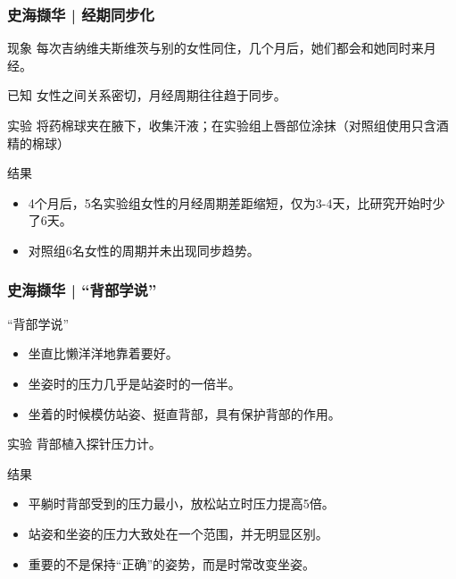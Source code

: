 \begin{frame}
  \frametitle{史海撷华 | 经期同步化}
  \begin{block}{现象}
    每次吉纳维夫\textbullet 斯维茨与别的女性同住，几个月后，她们都会和她同时来月经。
  \end{block}
  \pause
  \begin{block}{已知}
    女性之间关系密切，月经周期往往趋于同步。
  \end{block}
  \pause
  \begin{block}{实验}
    将药棉球夹在腋下，收集汗液；在实验组上唇部位涂抹（对照组使用只含酒精的棉球）
  \end{block}
  \pause
  \begin{block}{结果}
    \begin{itemize}
      \item 4个月后，5名实验组女性的月经周期差距缩短，仅为3-4天，比研究开始时少了6天。
      \item 对照组6名女性的周期并未出现同步趋势。
    \end{itemize}
  \end{block}
\end{frame}

\begin{frame}
  \frametitle{史海撷华 | “背部学说”}
  \begin{block}{“背部学说”}
    \begin{itemize}
      \item 坐直比懒洋洋地靠着要好。
      \item 坐姿时的压力几乎是站姿时的一倍半。
      \item 坐着的时候模仿站姿、挺直背部，具有保护背部的作用。
    \end{itemize}
  \end{block}
  \pause
  \begin{block}{实验}
    背部植入探针压力计。
  \end{block}
  \pause
  \begin{block}{结果}
    \begin{itemize}
      \item 平躺时背部受到的压力最小，放松站立时压力提高5倍。
      \item 站姿和坐姿的压力大致处在一个范围，并无明显区别。
      \item 重要的不是保持“正确”的姿势，而是时常改变坐姿。
    \end{itemize}
  \end{block}
\end{frame}

